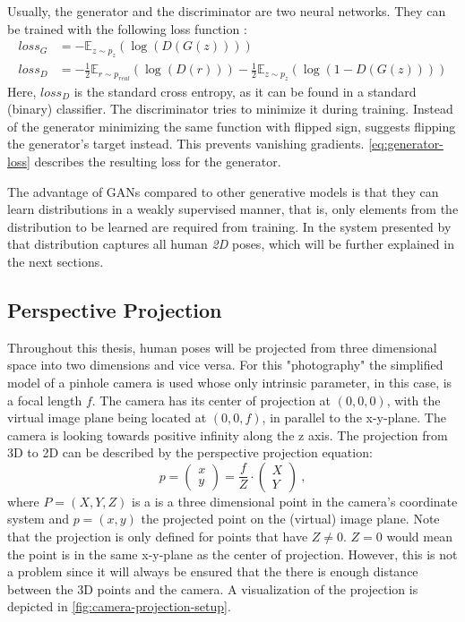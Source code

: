 Usually, the generator and the discriminator are two neural networks.
They can be trained with the following loss function \cite{goodfellow17}:
\begin{align}
\label{eq:generator-loss}
loss_G &= -\mathbb{E}_{z\sim p_{z}}(\log(D(G(z)))) \\
\label{eq:discriminator-loss}
loss_D &= -\frac{1}{2}\mathbb{E}_{r\sim p_{real}}(\log(D(r))) - \frac{1}{2} \mathbb{E}_{z\sim p_{z}}(\log(1 - D(G(z))))
\end{align}
Here, $loss_D$ is the standard cross entropy, as it can be found in a standard (binary) classifier.
The discriminator tries to minimize it during training.
Instead of the generator minimizing the same function with flipped sign, \citet{goodfellow17} suggests flipping the generator's target instead.
This prevents vanishing gradients.
\autoref{eq:generator-loss} describes the resulting loss for the generator.

The advantage of GANs compared to other generative models is that they can learn distributions in a weakly supervised manner, that is, only elements from the distribution to be learned are required from training.
In the system presented by \citet{drover18} that distribution captures all human \emph{2D} poses, which will be further explained in the next sections.

\subsection{Perspective Projection}



Throughout this thesis, human poses will be projected from three dimensional space into two dimensions and vice versa.
For this "photography" the simplified model of a pinhole camera is used whose only intrinsic parameter, in this case, is a focal length $f$.
The camera has its center of projection at $(0, 0, 0)$, with the virtual image plane being located at $(0, 0, f)$, in parallel to the x-y-plane.
The camera is looking towards positive infinity along the z axis.
The projection from 3D to 2D can be described by the perspective projection equation:
\begin{equation}
	\label{eq:perspective-projection}
	p = 
	\begin{pmatrix}
	x\\
	y
	\end{pmatrix}
	= \frac{f}{Z} \cdot 	
	\begin{pmatrix}
	X\\
	Y
	\end{pmatrix} \ ,
\end{equation}
where $P = (X, Y, Z)$ is a is a three dimensional point in the camera's coordinate system and $p = (x, y)$ the projected point on the (virtual) image plane.
Note that the projection is only defined for points that have $Z \neq 0$.
$Z = 0$ would mean the point is in the same x-y-plane as the center of projection.
However, this is not a problem since it will always be ensured that the there is enough distance between the 3D points and the camera.
A visualization of the projection is depicted in \autoref{fig:camera-projection-setup}.

